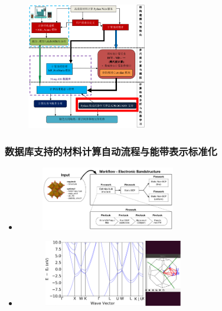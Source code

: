 \documentclass[cjk,slidestop,compress,mathserif,blue]{beamer}
\begin{document}
{\begin{minipage}[b]{0.49\linewidth}
\begin{itemize}
\begin{figure}[h!]
\includegraphics[height=2.18in]{Figures/MP_comp_BCC.png}
\label{MP_comp_BCC}
\end{figure}
	\end{itemize}
\end{minipage}
}

\frame
{
	\frametitle{数据库支持的材料计算自动流程与能带表示标准化}
	\begin{itemize}
		\item {\fontsize{8.2pt}{4.2pt}}
\begin{figure}[h!]
\centering
\vskip -5pt
\includegraphics[height=1.1in]{Figures/bandstructure_wf.png}
\label{bandstructure_wf}
\end{figure}
		\item {\fontsize{8.0pt}{4.2pt}}
\begin{figure}[h!]
\centering
\vspace*{-0.1in}
\includegraphics[height=1.15in,width=2.5in,viewport=0 0 1150 560,clip]{Figures/FCC_Si-k-path.png}
\label{FCC-Si_bandstruct}
\end{figure} 
	\end{itemize}
}
\end{document}
